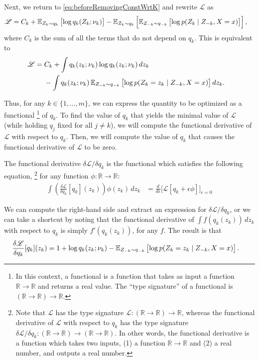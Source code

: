 \documentclass[11pt]{article}
\newcommand{\sL}{\mathscr{L}}
\begin{document}
Next, we return to \eqref{eq:beforeRemovingConstWrtK} and rewrite $\sL$ as
\begin{align}
\sL
&= C_k
    + \expectOver{Z_k \sim q_k}{\log q_k(Z_k; \nu_k)}
    - \expectOver{Z_k \sim q_k}{ \expectOver{Z_{-k} \sim q_{-k}}{ \log p(Z_k \mid Z_{-k}, X = x) } },
\end{align}
where $C_k$ is the sum of all the terms that do not depend on $q_k$.
This is equivalent to
\begin{align}
\sL
&= \begin{aligned}[t]
    & C_k + \int
       q_k(z_k; \nu_k) \log q_k(z_k; \nu_k) \, dz_k \\
    & - \int q_k(z_k; \nu_k) \, \expectOver{Z_{-k} \sim q_{-k}}{ \log p(Z_k = z_k \mid Z_{-k}, X = x) } dz_k.
    \end{aligned}
\end{align}

Thus, for any $k \in \{1, \ldots, m\}$, we can express the quantity to be optimized as a functional%
\footnote{In this context, a functional is a function that takes as input a function $\mathbb R \to \mathbb R$ and returns a real value.  The ``type signature'' of a functional is $(\mathbb R \to \mathbb R) \to \mathbb R$.}
of $q_k$.
To find the value of $q_k$ that yields the minimal value of $\sL$ (while holding $q_j$ fixed for all $j \neq k$), we will compute the functional derivative of $\sL$ with respect to $q_k$.
Then, we will compute the value of $q_k$ that causes the functional derivative of $\sL$ to be zero.

The functional derivative $\delta\sL / \delta q_k$ is the functional which satisfies the following equation,%
    \footnote{Note that $\sL$ has the type signature $\sL : (\mathbb R \to \mathbb R) \to \mathbb R$, whereas the functional derivative of $\sL$ with respect to $q_k$ has the type signature $\delta\sL/\delta q_k : (\mathbb R \to \mathbb R) \to (\mathbb R \to \mathbb R)$.
    In other words, the functional derivative is a function which takes two inputs, (1) a function $\mathbb R \to \mathbb R$ and (2) a real number, and outputs a real number.}
for any function $\phi : \mathbb R \to \mathbb R$:%
\begin{align}
\int \left( \frac{\delta \sL}{\delta q_k}[q_k](z_k) \right) \phi(z_k) \, dz_k
&=
\frac{d}{d\epsilon} \biggl[
    \sL[q_k + \epsilon \phi]
\biggr]_{\epsilon = 0}
\end{align}

We can compute the right-hand side and extract an expression for $\delta\sL / \delta q_k$, or we can take a shortcut by noting that the functional derivative of $\int f(q_k(z_k)) \, dz_k$ with respect to $q_k$ is simply $f'(q_k(z_k))$, for any $f$.
The result is that
\begin{align}
\frac{\delta \sL}{\delta q_k}[q_k](z_k)
&= 1 + \log q_k(z_k; \nu_k)
- \expectOver{Z_{-k} \sim q_{-k}}{ \log p(Z_k = z_k \mid Z_{-k}, X = x) }.
\end{align}
\end{document}
